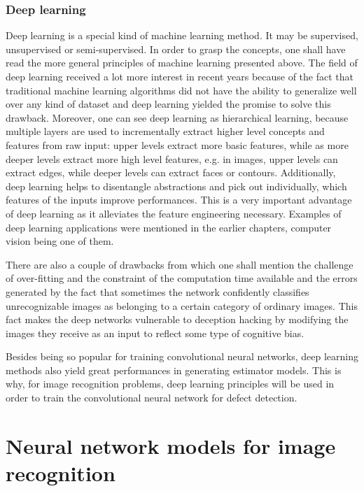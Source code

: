 \documentclass[12pt,a4paper,twoside]{report}
\begin{document}
\subsubsection{Deep learning}
Deep learning is a special kind of machine learning method. It may be supervised, unsupervised or semi-supervised. In order to grasp the concepts, one shall have read the more general principles of machine learning presented above. The field of deep learning received a lot more interest in recent years because of the fact that traditional machine learning algorithms did not have the ability to generalize well over any kind of dataset and deep learning yielded the promise to solve this drawback. Moreover, one can see deep learning as hierarchical learning, because multiple layers are used to incrementally extract higher level concepts and features from raw input: upper levels extract more basic features, while as more deeper levels extract more high level features, e.g. in images, upper levels can extract edges, while deeper levels can extract faces or contours. Additionally, deep learning helps to disentangle abstractions and pick out individually, which features of the inputs improve performances. This is a very important advantage of deep learning as it alleviates the feature engineering necessary. Examples of deep learning applications were mentioned in the earlier chapters, computer vision being one of them.\par
There are also a couple of drawbacks from which one shall mention the challenge of over-fitting and the constraint of the computation time available and the errors generated by the fact that sometimes the network confidently classifies unrecognizable images as belonging to a certain category of ordinary images. This fact makes the deep networks vulnerable to deception hacking by modifying the images they receive as an input to reflect some type of cognitive bias.\par
Besides being so popular for training convolutional neural networks, deep learning methods also yield great performances in generating estimator models. This is why, for image recognition problems, deep learning principles will be used in order to train the convolutional neural network for defect detection\cite{book-deeplearning}.\par



\section{Neural network models for image recognition}
\end{document}

